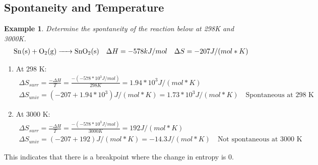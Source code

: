 \documentclass{article}  %
\newtheorem{exmp}{Example}
\begin{document}
\subsection*{Spontaneity and Temperature}
\begin{exmp}
    Determine the spontaneity of the reaction below at 298K and 3000K.
    \begin{equation*}
        \begin{aligned}
            \ce{Sn_(s) + O2_(g) -> SnO2_(s)} \quad \Delta H = -578 kJ/mol \quad \Delta S = -207 J/(mol*K)
        \end{aligned}
    \end{equation*}
\end{exmp}
\begin{enumerate}
    \item At 298 K:
        \begin{equation*}
            \begin{aligned}
                \Delta S _{surr} = \frac{-\Delta H}{T} = \frac{-(-578*10^3 J/mol)}{298K} = 1.94*10^3 J/(mol*K) \\
                \Delta S_{univ} = (-207 + 1.94*10^3) J/(mol*K) = 1.73*10^3 J/(mol*K) \quad \text{Spontaneous at 298 K}
            \end{aligned}
        \end{equation*}
    \item At 3000 K: 
        \begin{equation*}
            \begin{aligned}
                \Delta S _{surr} = \frac{-\Delta H}{T} = \frac{-(-578*10^3 J/mol)}{3000K} = 192 J/(mol*K) \\
                \Delta S_{univ} = (-207 + 192) J/(mol*K) = -14.3 J/(mol*K) \quad \text{Not spontaneous at 3000 K}
            \end{aligned}
        \end{equation*}
\end{enumerate}
This indicates that there is a breakpoint where the change in entropy is 0. 
\end{document}
